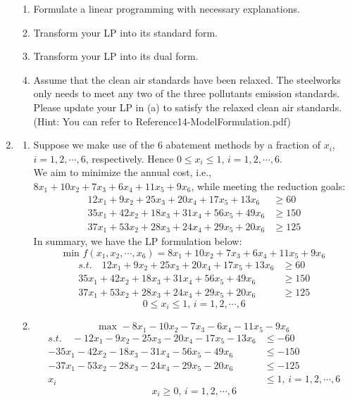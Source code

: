 \documentclass[12pt,a4paper]{article}
\makeatletter
\newtheorem*{solution}{Solution}
\theoremstyle{definition}
\renewenvironment{solution}[1][Solution] {\par\pushQED{\qed}\normalfont\topsep6\p@\@plus6\p@\relax\trivlist\item[\hskip\labelsep\bfseries#1\@addpunct{.}]\ignorespaces}{\popQED\endtrivlist\@endpefalse} \makeatother
\makeatother
\begin{document}
\begin{enumerate}
\begin{table}[h]
    \end{table}
     
    
    \begin{enumerate}
    	\item Formulate a linear programming with necessary explanations.
    	\item
    	Transform your LP into its standard form.
    	\item
    	Transform your LP into its dual form.
    	\item 
    	Assume that the clean air standards have been relaxed. The steelworks only needs to meet any two of the three pollutants emission standards. Please update your LP in (a) to satisfy the relaxed clean air standards. {\color{blue}(Hint: You can refer to Reference14-ModelFormulation.pdf)}
    	
    \end{enumerate}
     
    \begin{solution}
    	\hfill
    	\begin{enumerate}
    		\item 
    		Suppose we make use of the $6$ abatement methods by a fraction of $x_i$, $i = 1, 2, \cdots , 6$, respectively. Hence $0 \leq x_i \leq 1$, $i = 1, 2, \cdots , 6$. \\
    		We aim to minimize the annual cost, i.e., $8x_1 + 10x_2 + 7x_3 + 6x_4 + 11x_5 + 9x_6$, while meeting the reduction goals: 
    		\begin{align*}
	    		12x_1 + 9x_2 + 25x_3 + 20x_4 + 17x_5 + 13x_6 & \geq 60 \\
	    		35x_1 + 42x_2 + 18x_3 + 31x_4 + 56x_5 + 49x_6 & \geq 150 \\
	    		37x_1 + 53x_2 + 28x_3 + 24x_4 + 29x_5 + 20x_6 & \geq 125
    		\end{align*}
    		In summary, we have the LP formulation below: 
    		\[\text{min } f(x_1, x_2, \cdots , x_6) = 8x_1 + 10x_2 + 7x_3 + 6x_4 + 11x_5 + 9x_6\]
    		\begin{align*}
	    		s.t. \quad 12x_1 + 9x_2 + 25x_3 + 20x_4 + 17x_5 + 13x_6 & \geq 60 \\
	    		35x_1 + 42x_2 + 18x_3 + 31x_4 + 56x_5 + 49x_6 & \geq 150 \\
	    		37x_1 + 53x_2 + 28x_3 + 24x_4 + 29x_5 + 20x_6 & \geq 125 
    		\end{align*}
    		\[0 \leq x_i \leq 1, \, i = 1, 2, \cdots , 6\]
    		\item
    		\[\text{max } -8x_1 - 10x_2 - 7x_3 - 6x_4 - 11x_5 - 9x_6\]
    		\begin{align*}
    		s.t. \quad -12x_1 - 9x_2 - 25x_3 - 20x_4 - 17x_5 - 13x_6 & \leq -60 \\
    		-35x_1 - 42x_2 - 18x_3 - 31x_4 - 56x_5 - 49x_6 & \leq -150 \\
    		-37x_1 - 53x_2 - 28x_3 - 24x_4 - 29x_5 - 20x_6 & \leq -125 \\
    		x_i & \leq 1 , \, i = 1, 2, \cdots , 6
    		\end{align*}
    		\[x_i \geq 0 , \, i = 1, 2, \cdots , 6\]
    		

\end{enumerate}
\end{solution}
\end{enumerate}
\end{document}

